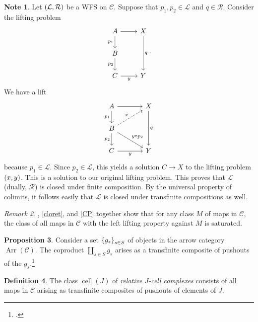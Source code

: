 \documentclass[10pt,letterpaper,cm]{nupset}
\theoremstyle{definition}
\newtheorem{definition}{Definition}[subsection]
\newtheorem{note}[definition]{Note}
\theoremstyle{theorem}
\newtheorem{prop}[definition]{Proposition}
\theoremstyle{remark}
\newtheorem{remark}[definition]{Remark}
\renewcommand{\L}{\mathcal L}
\newcommand{\RI}{\mathcal R}
\newcommand{\0}{\mathbf{0}}
\newcommand{\1}{\mathbf{1}}
\newcommand{\2}{\mathbf{2}}
\DeclareMathOperator{\Ar}{Arr}
\renewcommand{\c}{\mathscr{C}}
\DeclareMathOperator{\cell}{cell}
\begin{document}
\begin{note}\label{transf}
Let $\mleft(\L, \RI\mright)$ be a WFS on $\c$. Suppose that $p_1, p_2 \in \L$ and $q\in \RI$. Consider the lifting problem
\[
\begin{tikzcd}
A \arrow[d, "p_1"'] \arrow[r] & X \arrow[dd, "q"] \\
B \arrow[d, "p_2"']           &                   \\
C \arrow[r, "y"']                   & Y                
\end{tikzcd}
.\] We have a lift
\[
\begin{tikzcd}[column sep=large]
A \arrow[d, "p_1"'] \arrow[r]                          & X \arrow[dd, "q"] \\
B \arrow[d, "p_2"'] \arrow[rd, "y\circ p_2"] \arrow[ru, "x", dashed] &                   \\
C \arrow[r, "y"']                                            & Y                
\end{tikzcd}
\] because $p_1 \in \L$. Since $p_2 \in \L$, this yields a solution $C \to X$ to the lifting problem $\mleft(x,y\mright)$. This is a solution to our original lifting problem. This proves that $\L$ (dually, $\RI$) is closed under finite composition. By the universal property of colimits, it follows easily that $\L$ is closed under transfinite compositions as well.
\end{note}

\begin{remark}\label{Satd}
, \cref{cloret}, and \cref{CP} together show that for any class $M$ of maps in $\c$, the class of all maps in $\c$ with the left lifting property against $M$ is saturated.
\end{remark}

\begin{prop}\label{coppush}
Consider  a set $\mleft\{g_s\mright\}_{s\in S}$ of objects in the arrow category $\Ar(\c)$. The coproduct $\coprod_{s\in S}g_s$ arises as a transfinite composite  of pushouts of the $g_s$.\footnote{\cite[Proposition 10.2.7]{Hirsch}.}
\end{prop}

\begin{definition}
The class $\cell(J)$ of \textit{relative $J$-cell complexes} consists of all maps in $\c$ arising as transfinite composites of pushouts of elements of $J$.
\end{definition}
\end{document}
